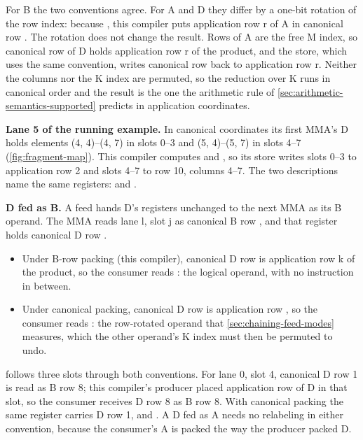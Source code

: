 For B the two conventions agree. For A and D they differ by a one-bit rotation of the row index: because
, this compiler puts application row r of A in canonical row . The
rotation does not change the result. Rows of A are the free M index, so canonical row  of D holds application row r of
the product, and the store, which uses the same convention, writes canonical row  back to application row
r. Neither the columns nor the K index are permuted, so the reduction over K runs in canonical order and the result is
the one the arithmetic rule of \cref{sec:arithmetic-semantics-supported} predicts in application coordinates.

\textbf{Lane 5 of the running example.} In canonical coordinates its first MMA's D holds elements (4, 4)–(4, 7) in
slots 0–3 and (5, 4)–(5, 7) in slots 4–7 (\cref{fig:fragment-map}). This compiler computes  and
, so its store writes slots 0–3 to application row 2 and slots 4–7 to row 10, columns 4–7. The two
descriptions name the same registers:  and .

\textbf{D fed as B.} A feed hands D's registers unchanged to the next
MMA as its B operand. The MMA reads lane l, slot j as canonical B row , and
that register holds canonical D row .

\begin{itemize}
\item Under B-row packing (this compiler), canonical D row  is application row k of the product, so the
  consumer reads : the logical operand, with no instruction in between.
\item Under canonical packing, canonical D row  is application row , so the consumer reads
  : the row-rotated operand that \cref{sec:chaining-feed-modes} measures, which the other
  operand's K index must then be permuted to undo.
\end{itemize}

 follows three slots through both conventions. For lane 0, slot 4, canonical D row 1 is
read as B row 8; this compiler's producer placed application row  of D in that slot, so the consumer
receives D row 8 as B row 8. With canonical packing the same register carries D row 1, and . A D fed
as A needs no relabeling in either convention, because the consumer's A is packed the way the producer packed D.

